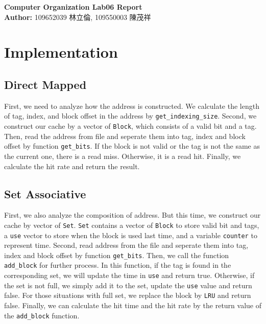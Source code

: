 \documentclass{article}
\begin{document}
\begin{CJK*}{UTF8}{bkai}
    \begin{center}
        {\Huge \textbf{Computer Organization Lab06 Report}} \\
        {\large \textbf{Author:} 109652039 林立倫, 109550003 陳茂祥}
    \end{center}
\end{CJK*}

\section{Implementation}
\subsection{Direct Mapped}
First, we need to analyze how the address is constructed. We calculate the length of tag, index, and block offset in the address by \verb|get_indexing_size|. 
Second, we construct our cache by a vector of \verb|Block|, which consists of a valid bit and a tag.
Then, read the address from file and seperate them into tag, index and block offset by function \verb|get_bits|.
If the block is not valid or the tag is not the same as the current one, there is a read miss. Otherwise, it is a read hit.
Finally, we calculate the hit rate and return the result.

\subsection{Set Associative}
First, we also analyze the composition of address. But this time, we construct our cache by vector of \verb|Set|.
\verb|Set| contains a vector of \verb|Block| to store valid bit and tags, a \verb|use| vector to store when the block is used last time, and a variable \verb|counter| to represent time.
Second, read address from the file and seperate them into tag, index and block offset by function \verb|get_bits|.
Then, we call the function \verb|add_block| for further process. In this function, if the tag is found in the corresponding set, we will update the time in \verb|use| and return true. 
Otherwise, if the set is not full, we simply add it to the set, update the \verb|use| value and return false. 
For those situations with full set, we replace the block by \verb|LRU| and return false. 
Finally, we can calculate the hit time and the hit rate by the return value of the \verb|add_block| function.

\newpage
\end{document}
